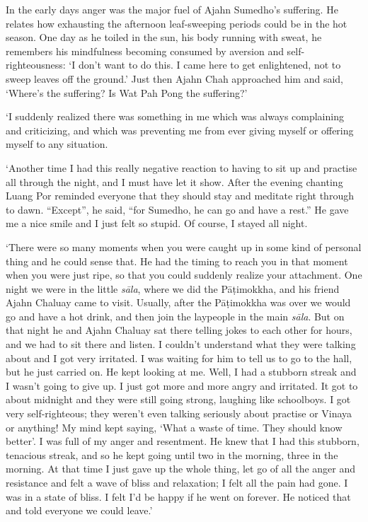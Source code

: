 In the early days anger was the major fuel of Ajahn Sumedho's suffering. 
He relates how exhausting the afternoon leaf-sweeping periods could be
in the hot season. One day as he toiled in the sun, his body running
with sweat, he remembers his mindfulness becoming consumed by aversion
and self-righteousness: `I don't want to do this. I came here to get
enlightened, not to sweep leaves off the ground.' Just then Ajahn Chah
approached him and said, `Where's the suffering? Is Wat Pah Pong the
suffering?'

`I suddenly realized there was something in me which was always
complaining and criticizing, and which was preventing me from ever
giving myself or offering myself to any situation. 

`Another time I had this really negative reaction to having to sit up
and practise all through the night, and I must have let it show. After
the evening chanting Luang Por reminded everyone that they should stay
and meditate right through to dawn. ``Except'', he said, ``for Sumedho, 
he can go and have a rest.'' He gave me a nice smile and I just felt so
stupid. Of course, I stayed all night. 

`There were so many moments when you were caught up in some kind of
personal thing and he could sense that. He had the timing to reach you
in that moment when you were just ripe, so that you could suddenly
realize your attachment. One night we were in the little \emph{sāla}, 
where we did the Pāṭimokkha, and his friend Ajahn Chaluay came to visit. 
Usually, after the Pāṭimokkha was over we would go and have a hot drink, 
and then join the laypeople in the main \emph{sāla}. But on that night
he and Ajahn Chaluay sat there telling jokes to each other for hours, 
and we had to sit there and listen. I couldn't understand what they were
talking about and I got very irritated. I was waiting for him to tell us
to go to the hall, but he just carried on. He kept looking at me. Well, 
I had a stubborn streak and I wasn't going to give up. I just got more
and more angry and irritated. It got to about midnight and they were
still going strong, laughing like schoolboys. I got very self-righteous; 
they weren't even talking seriously about practise or Vinaya or
anything! My mind kept saying, `What a waste of time. They should know
better'. I was full of my anger and resentment. He knew that I had this
stubborn, tenacious streak, and so he kept going until two in the
morning, three in the morning. At that time I just gave up the whole
thing, let go of all the anger and resistance and felt a wave of bliss
and relaxation; I felt all the pain had gone. I was in a state of bliss. 
I felt I'd be happy if he went on forever. He noticed that and told
everyone we could leave.'


